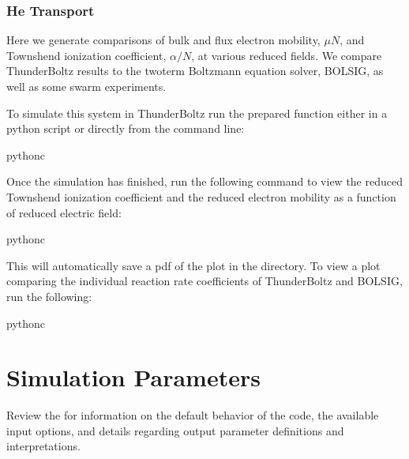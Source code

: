\documentclass[letterpaper,10pt,english,openany,oneside]{sphinxmanual}
\begin{document}
\subsection{He Transport}
\label{\detokenize{bm:he-transport}}
\sphinxAtStartPar
Here we generate comparisons of bulk and flux electron mobility, \(\mu N\), and
Townshend ionization coefficient, \(\alpha / N\), at various reduced fields.
We compare ThunderBoltz results to the two\sphinxhyphen{}term Boltzmann equation solver, BOLSIG,
as well as some swarm experiments.

\sphinxAtStartPar
To simulate this system in ThunderBoltz run the prepared function either in a
python script or directly from the command line:

\begin{sphinxVerbatim}[commandchars=\\\{\}]
python\PYGZhy{}c
\end{sphinxVerbatim}

\sphinxAtStartPar
Once the simulation has finished, run the following command to view
the reduced Townshend ionization coefficient and the reduced electron mobility
as a function of reduced electric field:

\begin{sphinxVerbatim}[commandchars=\\\{\}]
python\PYGZhy{}c
\end{sphinxVerbatim}

\sphinxAtStartPar
This will automatically save a pdf of the plot in the 
directory. To view a plot comparing the individual reaction rate coefficients of
ThunderBoltz and BOLSIG, run the following:

\begin{sphinxVerbatim}[commandchars=\\\{\}]
python\PYGZhy{}c
\end{sphinxVerbatim}


\chapter{Simulation Parameters}
\label{\detokenize{index:simulation-parameters}}
\sphinxAtStartPar
Review the {\hyperref[\detokenize{params::doc}]{}} for information on
the default behavior of the code, the available input options, and
details regarding output parameter definitions and interpretations.
\end{document}

